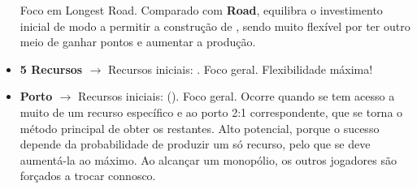 \documentclass[12pt]{article}
\begin{document}
\begin{itemize}
    Foco em Longest Road.
    Comparado com \textbf{Road}, equilibra o investimento inicial de modo a permitir a construção de , sendo muito flexível por ter outro meio de ganhar pontos e aumentar a produção.
    \item \textbf{5 Recursos $\rightarrow$}
    Recursos iniciais: .
    Foco geral.
    Flexibilidade máxima!
    \item \textbf{Porto $\rightarrow$}
    Recursos iniciais: ().
    Foco geral.
    Ocorre quando se tem acesso a muito de um recurso específico e ao porto 2:1 correspondente, que se torna o método principal de obter os restantes. 
    Alto potencial, porque o sucesso depende da probabilidade de produzir um só recurso, pelo que se deve aumentá-la ao máximo. 
    Ao alcançar um monopólio, os outros jogadores são forçados a trocar connosco.
\end{itemize}
\end{document}
